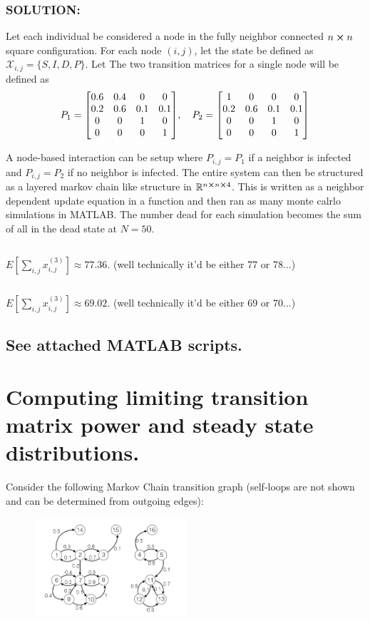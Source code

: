 \documentclass[]{article}
\newcommand{\Solution}{\subsubsection*{\textbf{SOLUTION:}}}
\newcommand{\R}{\mathbb{R}}
\begin{document}
\Solution
Let each individual be considered a node in the fully neighbor connected $n \cross n$ square configuration.
For each node $(i,j)$, let the state be defined as $\mathcal{X}_{i,j} = \{S,I,D,P\}$.
Let The two transition matrices for a single node will be defined as 
\[
    P_1 = \mqty[
        0.6 & 0.4 & 0   & 0   \\
        0.2 & 0.6 & 0.1 & 0.1 \\
        0   & 0   & 1   & 0   \\
        0   & 0   & 0   & 1
    ], \quad P_2 = \mqty[
        1   & 0   & 0   & 0   \\
        0.2 & 0.6 & 0.1 & 0.1 \\
        0   & 0   & 1   & 0   \\
        0   & 0   & 0   & 1]
\]

A node-based interaction can be setup where $P_{i,j} = P_1$ if a neighbor is infected and $P_{i,j} = P_2$ if no neighbor is infected.
The entire system can then be structured as a layered markov chain like structure in $\R^{n\cross n \cross 4}$.
This is written as a neighbor dependent update equation in a function and then ran as many monte calrlo simulations in MATLAB. 
The number dead for each simulation becomes the sum of all in the dead state at $N=50$.

\subsection{}
$E[\sum_{i,j} x_{i,j}^{(3)}] \approx 77.36$. (well technically it'd be either 77 or 78...)
\subsection{}
$E[\sum_{i,j} x_{i,j}^{(3)}] \approx 69.02$. (well technically it'd be either 69 or 70...)

\subsection*{See attached MATLAB scripts.}

\newpage
\section{Computing limiting transition matrix power and steady state distributions.}
Consider the following Markov Chain transition graph (self-loops are not shown and can be determined from outgoing edges):
\begin{figure}[h]
    \centering
    \includegraphics[width=0.5\textwidth]{figs/MECH6326_pblm2_chains.png}
\end{figure}
\end{document}
